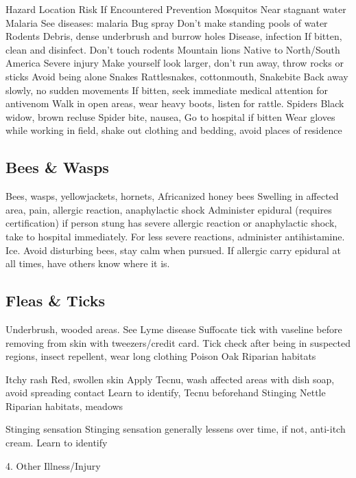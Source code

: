 \documentclass[12pt]{../SOP2}
\begin{document}
Hazard
Location
Risk
If Encountered
Prevention
Mosquitos
Near stagnant water
Malaria
See diseases: malaria
Bug spray
Don’t make standing pools of water
Rodents
Debris, dense underbrush and burrow holes
Disease, infection
If bitten, clean and disinfect.
Don’t touch rodents
Mountain lions
Native to North/South America
Severe injury
Make yourself look larger, don’t run away, throw rocks or sticks
Avoid being alone 
Snakes
Rattlesnakes, cottonmouth, 
Snakebite
Back away slowly, no sudden movements
If bitten, seek immediate medical attention for antivenom
Walk in open areas, wear heavy boots, listen for rattle.
Spiders
Black widow, brown recluse
Spider bite, nausea, 
Go to hospital if bitten
Wear gloves while working in field, shake out clothing and bedding, avoid places of residence

\subsection{Bees \& Wasps}

Bees, wasps, yellowjackets, hornets, Africanized honey bees
Swelling in affected area, pain, allergic reaction, anaphylactic shock
Administer epidural (requires certification) if person stung has severe allergic reaction or anaphylactic shock, take to hospital immediately. For less severe reactions, administer antihistamine. Ice.
Avoid disturbing bees, stay calm when pursued. If allergic carry epidural at all times, have others know where it is.

\subsection{Fleas \& Ticks}

Underbrush, wooded areas.
See Lyme disease
Suffocate tick with vaseline before removing from skin with tweezers/credit card.
Tick check after being in suspected regions, insect repellent, wear long clothing
Poison Oak
Riparian habitats

Itchy rash
Red, swollen skin
Apply Tecnu, wash affected areas with dish soap, avoid spreading contact
Learn to identify, Tecnu beforehand
Stinging Nettle
Riparian habitats, meadows

Stinging sensation
Stinging sensation generally lessens over time, if not, anti-itch cream.
Learn to identify


4. Other Illness/Injury
\end{document}
